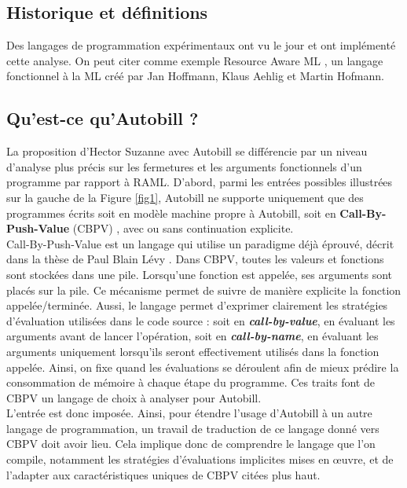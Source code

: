 \documentclass[12pt]{article}
\begin{document}
\pagebreak
\subsection{Historique et définitions}\label{historique-et-définitions}
Des langages de programmation expérimentaux ont vu le jour et ont implémenté cette analyse. On peut citer comme exemple Resource Aware ML \cite{RAML}, un langage fonctionnel à la ML créé par Jan Hoffmann, Klaus Aehlig et Martin Hofmann.

\hypertarget{quest-ce-quautobill}{%
      \subsection{Qu'est-ce qu'Autobill ?}\label{quest-ce-quautobill}}

La proposition d'Hector Suzanne avec Autobill se différencie par un
niveau d'analyse plus précis sur les fermetures et les arguments
fonctionnels d'un programme par rapport à RAML. D'abord, parmi les entrées possibles
illustrées sur la gauche de la Figure \ref{fig1}, Autobill ne supporte
uniquement que des programmes écrits soit en modèle machine propre à
Autobill, soit en \textbf{Call-By-Push-Value} (CBPV)
\cite{Levy}, avec ou sans continuation
explicite. \\

Call-By-Push-Value est un langage qui utilise un paradigme déjà éprouvé,
décrit dans la thèse de Paul Blain Lévy
\cite{Levy}. Dans CBPV, toutes les valeurs et fonctions sont stockées dans une pile. Lorsqu'une fonction est appelée, ses arguments sont placés sur la pile. Ce mécanisme permet de suivre de manière explicite la fonction appelée/terminée. Aussi,
le langage permet d'exprimer clairement les stratégies d'évaluation utilisées dans le code source : soit en \textbf{\textit{call-by-value}}, en évaluant les arguments avant de lancer l'opération, soit en \textbf{\textit{call-by-name}}, en évaluant les arguments uniquement lorsqu’ils seront effectivement utilisés dans la fonction appelée. Ainsi, on fixe quand les évaluations se déroulent afin de mieux prédire la consommation de mémoire à chaque
étape du programme. Ces traits font de CBPV un langage de choix à analyser pour Autobill. \\

L'entrée est donc imposée. Ainsi, pour étendre l'usage d'Autobill à un
autre langage de programmation, un travail de traduction de ce langage
donné vers CBPV doit avoir lieu. Cela implique donc de comprendre le
langage que l'on compile, notamment les stratégies d'évaluations
implicites mises en œuvre, et de l'adapter aux caractéristiques uniques
de CBPV citées plus haut. \\
\end{document}
